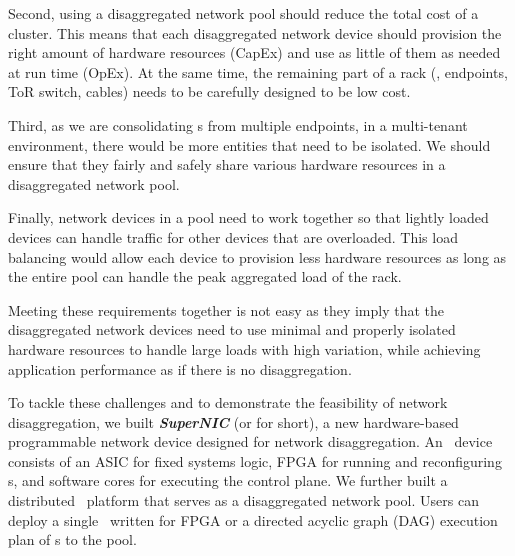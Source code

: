 Second, using a disaggregated network pool should reduce the total cost of a cluster. This means that each disaggregated network device should provision the right amount of hardware resources (CapEx) and use as little of them as needed at run time (OpEx). At the same time, the remaining part of a rack (\eg, endpoints, ToR switch, cables) needs to be carefully designed to be low cost.

Third, as we are consolidating \nt{}s from multiple endpoints, in a multi-tenant environment, there would be more entities that need to be isolated. We should ensure that they fairly and safely share various hardware resources in a disaggregated network pool. 

Finally, network devices in a pool need to work together so that lightly loaded devices can handle traffic for other devices that are overloaded.
This load balancing would allow each device to provision less hardware resources as long as the entire pool can handle the peak aggregated load of the rack.


Meeting these requirements together is not easy as they imply that the disaggregated network devices need to use minimal and properly isolated hardware resources to handle large loads with high variation, while achieving application performance as if there is no disaggregation.

To tackle these challenges and to demonstrate the feasibility of network disaggregation, we built \textit{\textbf{SuperNIC}} (or \textit{\snic} for short), a new hardware-based programmable network device designed for network disaggregation.
An \snic\ device consists of an ASIC for fixed systems logic, FPGA for running and reconfiguring \nt{}s, and software cores for executing the control plane.
We further built a distributed \snic\ platform that serves as a disaggregated network pool.
Users can deploy a single \nt\ written for FPGA or a directed acyclic graph (DAG) execution plan of \nt{}s to the pool.

